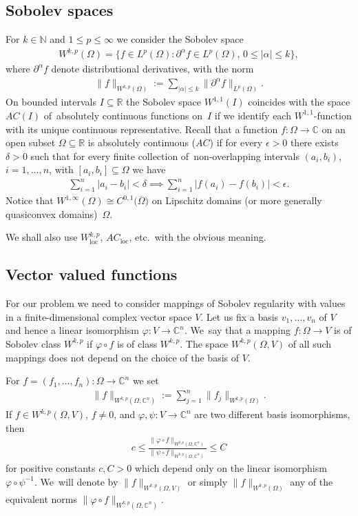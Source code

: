 \documentclass[11pt]{article}
\numberwithin{equation}{section}
\numberwithin{equation}{section}
\def\al{\alpha}
\def\de{\delta}
\def\ep{\epsilon}
\def\vh{\varphi}
\def\ps{\psi}
\def\Om{\Omega}
\def\C{\mathbb{C}}
\def\N{\mathbb{N}}
\def\R{\mathbb{R}}
\def\p{\partial}
\def\ol{\overline}
\renewcommand{\o}{\circ}
\let\on=\operatorname
\begin{document}
\subsection{Sobolev spaces}
For $k \in \N$ and $1 \le p \le \infty$ we consider the Sobolev space
\begin{gather*}
 W^{k,p}(\Om) = \big\{f \in L^p(\Om) \colon \p^\al f \in L^p(\Om), \, 0 \le |\al| \le k\big\},
\end{gather*}
where $\p^\al f$ denote distributional derivatives, with the norm
\begin{gather*}
 \|f\|_{W^{k,p}(\Om)} := \sum_{|\al| \le k} \|\p^\al f\|_{L^p(\Om)}.
\end{gather*}
On bounded intervals $I \subseteq \R$ the Sobolev space $W^{1,1}(I)$
coincides with the space $AC(I)$ of~abso\-lutely continuous functions on~$I$
if we identify each $W^{1,1}$-function with its unique continuous representative.
Recall that a function $f \colon \Om \to \C$ on an open subset $\Om \subseteq \R$
is absolutely continuous ($AC$) if for every $\ep>0$ there exists $\de>0$ such that
for every finite collection of~non-overlapping intervals $(a_i,b_i)$, $i =1,\dots,n$, with
$[a_i,b_i] \subseteq \Om$ we have
\begin{gather*}
 \sum_{i=1}^n |a_i -b_i| < \de \implies \sum_{i=1}^n |f(a_i) -f(b_i)| < \ep.
\end{gather*}
Notice that $W^{1,\infty}(\Om) \cong C^{0,1}\big(\ol \Om\big)$ on Lipschitz domains (or more generally quasiconvex domains)~$\Om$.

We shall also use $W^{k,p}_{\on{loc}}$, $AC_{\on{loc}}$, etc.\ with the obvious meaning.

\subsection{Vector valued functions}

For our problem we need to consider mappings of Sobolev regularity with values in a finite-dimensional complex vector space $V$.
Let us fix a basis $v_1, \dots, v_n$ of $V$ and hence a linear isomorphism $\vh \colon V \to \C^n$. We~say that a mapping $f \colon \Om \to V$ is of Sobolev class $W^{k,p}$ if $\vh \o f$ is of class $W^{k,p}$.
The space $W^{k,p}(\Om, V)$ of all such mappings does not depend on the choice of the basis of $V$.

For $f= (f_1,\dots,f_n) \colon \Om \to \C^n$ we set
\begin{gather} \label{vectorvalued}
 \|f\|_{W^{k,p}(\Om,\C^n)} := \sum_{j=1}^n \|f_j\|_{W^{k,p}(\Om)}.
\end{gather}
If $f \in W^{k,p}(\Om, V)$, $f \ne 0$, and $\vh,\ps \colon V \to \C^n$ are two different basis isomorphisms, then
\begin{gather*}
 c \le \frac{\|\vh \o f\|_{W^{k,p}(\Om,\C^n)}}{\|\ps \o f\|_{W^{k,p}(\Om,\C^n)}} \le C
\end{gather*}
for positive constants $c,C>0$ which depend only on the linear isomorphism $\vh \o \ps^{-1}$. We~will denote by ${\|f\|_{W^{k,p}(\Om,V)}}$ or simply ${\|f\|_{W^{k,p}(\Om)}}$ any of the equivalent norms
$\|\vh \o f\|_{W^{k,p}(\Om,\C^n)}$.
\end{document}
